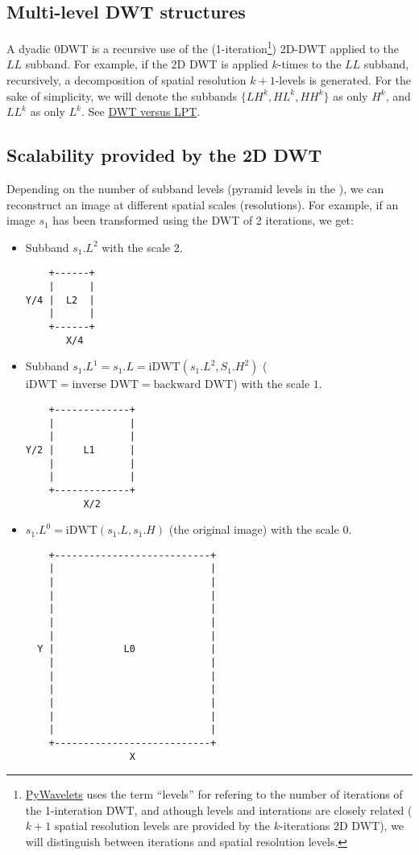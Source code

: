 \subsection{Multi-level DWT structures}
A dyadic 0DWT is a recursive use of the
(1-iteration\footnote{\href{https://pywavelets.readthedocs.io/en/latest/index.html}{PyWavelets}
  uses the term ``levels'' for refering to the number of iterations of
  the 1-interation DWT, and athough levels and interations are closely
  related ($k+1$ spatial resolution levels are provided by the
  $k$-iterations 2D DWT), we will distinguish between iterations and
  spatial resolution levels.}) 2D-DWT applied to the $LL$ subband. For
example, if the 2D DWT is applied $k$-times to the $LL$ subband,
recursively, a decomposition of spatial resolution $k+1$-levels is
generated. For the sake of simplicity, we will denote the subbands
$\{LH^k, HL^k, HH^k\}$ as only $H^k$, and $LL^k$ as only $L^k$. See
\href{https://nbviewer.jupyter.org/github/Sistemas-Multimedia/MCDWT/blob/master/docs/DWT_vs_LPT.ipynb}{DWT
  versus LPT}.

\subsection{Scalability provided by the 2D DWT}
Depending on the number of subband levels (pyramid levels in the
), we can reconstruct an image at different spatial
scales (resolutions). For example, if an image $s_1$ has been
transformed using the DWT of 2 iterations, we get:
\begin{itemize}
\item Subband $s_1.L^2$ with the scale 2.
\begin{verbatim}
    +------+
    |      |
Y/4 |  L2  |
    |      |
    +------+
       X/4
\end{verbatim}
\item Subband $s_1.L^1=s_1.L=\text{iDWT}(s_1.L^2, S_1.H^2)$
  ($\text{iDWT}=\text{inverse DWT}=\text{backward DWT}$) with the
  scale $1$.
\begin{verbatim}
    +-------------+
    |             |
    |             |
Y/2 |     L1      |
    |             | 
    |             |
    +-------------+
          X/2
\end{verbatim}
  
\item $s_1.L^0=\text{iDWT}(s_1.L, s_1.H)$ (the original image) with
  the scale $0$.
\begin{verbatim}
    +---------------------------+
    |                           |
    |                           |
    |                           | 
    |                           |
    |                           |
    |                           |
  Y |            L0             |
    |                           | 
    |                           |
    |                           | 
    |                           | 
    |                           |
    |                           |
    +---------------------------+
                  X
\end{verbatim}
\end{itemize}

